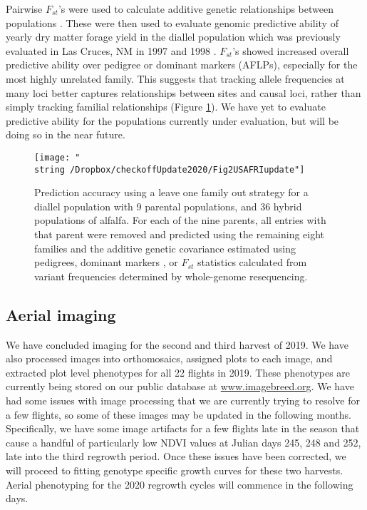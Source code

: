 \documentclass[12pt, letterpaper]{article}
\begin{document}
Pairwise $F_{st}$'s were used to calculate additive genetic relationships between populations \parencite{weir2002}. These were then used to evaluate genomic predictive ability of yearly dry matter forage yield in the diallel population which was previously evaluated in Las Cruces, NM in 1997 and 1998 \parencite{segovia2004}. $F_{st}$'s showed increased overall predictive ability over pedigree or dominant markers (AFLPs), especially for the most highly unrelated family. This suggests that tracking allele frequencies at many loci better captures relationships between sites and causal loci, rather than simply tracking familial relationships (Figure \ref{predacc}). We have yet to evaluate predictive ability for the populations currently under evaluation, but will be doing so in the near future. 

\begin{figure}
\texttt{[image: "\\string~/Dropbox/checkoffUpdate2020/Fig2USAFRIupdate"]}
\caption{Prediction accuracy using a leave one family out strategy for a diallel population with 9 parental populations, and 36 hybrid populations of alfalfa. For each of the nine parents, all entries with that parent were removed and predicted using the remaining eight families and the additive genetic covariance estimated using pedigrees, dominant markers \parencite[AFLPs;][]{segovia2004}, or $F_{st}$ statistics calculated from variant frequencies determined by whole-genome resequencing.}
\label{predacc}
\end{figure}

\subsection{Aerial imaging}

We have concluded imaging for the second and third harvest of 2019. We have also processed images into orthomosaics, assigned plots to each image, and extracted plot level phenotypes for all 22 flights in 2019. These phenotypes are currently being stored on our public database at \href{http://www.imagebreed.org}{www.imagebreed.org}. We have had some issues with image processing that we are currently trying to resolve for a few flights, so some of these images may be updated in the following months. Specifically, we have some image artifacts for a few flights late in the season that cause a handful of particularly low NDVI values at Julian days 245, 248 and 252, late into the third regrowth period. Once these issues have been corrected, we will proceed to fitting genotype specific growth curves for these two harvests. Aerial phenotyping for the 2020 regrowth cycles will commence in the following days. 
\end{document}
